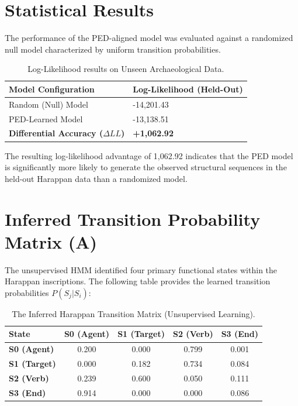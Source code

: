 \section{Statistical Results}
The performance of the PED-aligned model was evaluated against a randomized null model characterized by uniform transition probabilities.

\begin{table}[h]
\centering
\begin{tabular}{ll} \toprule
\textbf{Model Configuration} & \textbf{Log-Likelihood (Held-Out)} \\ \midrule
Random (Null) Model & -14,201.43 \\
PED-Learned Model & -13,138.51 \\ \midrule
\textbf{Differential Accuracy ($\Delta LL$)} & \textbf{+1,062.92} \\ \bottomrule
\end{tabular}
\caption{Log-Likelihood results on Unseen Archaeological Data.}
\end{table}

The resulting log-likelihood advantage of 1,062.92 indicates that the PED model is significantly more likely to generate the observed structural sequences in the held-out Harappan data than a randomized model.

\section{Inferred Transition Probability Matrix (A)}
The unsupervised HMM identified four primary functional states within the Harappan inscriptions. The following table provides the learned transition probabilities $P(S_j | S_i)$:

\begin{table}[h]
\centering
\begin{tabular}{lcccc} \toprule
\textbf{State} & \textbf{S0 (Agent)} & \textbf{S1 (Target)} & \textbf{S2 (Verb)} & \textbf{S3 (End)} \\ \midrule
\textbf{S0 (Agent)} & 0.200 & 0.000 & 0.799 & 0.001 \\
\textbf{S1 (Target)} & 0.000 & 0.182 & 0.734 & 0.084 \\
\textbf{S2 (Verb)} & 0.239 & 0.600 & 0.050 & 0.111 \\
\textbf{S3 (End)} & 0.914 & 0.000 & 0.000 & 0.086 \\ \bottomrule
\end{tabular}
\caption{The Inferred Harappan Transition Matrix (Unsupervised Learning).}
\end{table}

